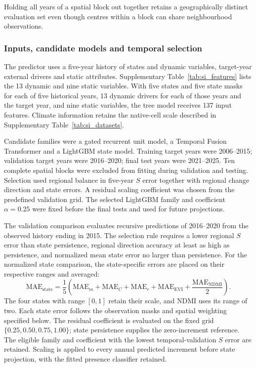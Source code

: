  Holding all years of a spatial block out together retains a geographically distinct evaluation set even though centres within a block can share neighbourhood observations.

\subsubsection{Inputs, candidate models and temporal selection}

The predictor uses a five-year history of states and dynamic variables, target-year external drivers and static attributes. Supplementary Table~\ref{tab:si_features} lists the 13 dynamic and nine static variables. With five states and five state masks for each of five historical years, 13 dynamic drivers for each of those years and the target year, and nine static variables, the tree model receives 137 input features.  Climate information retains the native-cell scale described in Supplementary Table~\ref{tab:si_datasets}.

Candidate families were a gated recurrent unit model, a Temporal Fusion Transformer\cite{ref053} and a LightGBM state model\cite{Ke2017}. Training target years were 2006--2015; validation target years were 2016--2020; final test years were 2021--2025. Ten complete spatial blocks were excluded from fitting during validation and testing. Selection used regional balance in five-year $S$ error together with regional change direction and state errors. A residual scaling coefficient was chosen from the predefined validation grid. The selected LightGBM family and coefficient $\alpha=0.25$ were fixed before the final tests and used for future projections.

The validation comparison evaluates recursive predictions of 2016--2020 from the observed history ending in 2015. The selection rule requires a lower regional $S$ error than state persistence, regional direction accuracy at least as high as persistence, and normalized mean state error no larger than persistence. For the normalized state comparison, the state-specific errors are placed on their respective ranges and averaged:
\[
\mathrm{MAE}_{\mathrm{state}}=\frac{1}{5}\left(\mathrm{MAE}_m+\mathrm{MAE}_C+\mathrm{MAE}_r+\mathrm{MAE}_{\mathrm{EVI}}+\frac{\mathrm{MAE}_{\mathrm{NDMI}}}{2}\right).
\]
The four states with range $[0,1]$ retain their scale, and NDMI uses its range of two. Each state error follows the observation masks and spatial weighting specified below. The residual coefficient is evaluated on the fixed grid $\{0.25,0.50,0.75,1.00\}$; state persistence supplies the zero-increment reference. The eligible family and coefficient with the lowest temporal-validation $S$ error are retained. Scaling is applied to every annual predicted increment before state projection, with the fitted presence classifier retained. 

